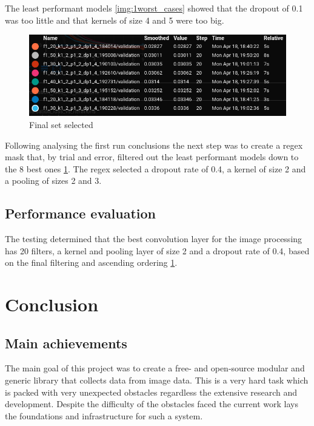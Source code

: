 \documentclass[
    11pt,
    oneside
]{report}
\begin{document}
The least performant models \ref{img:1worst_cases} showed that the dropout of 0.1 was too little and that kernels of size 4 and 5 were too big.


\begin{figure}[H]
    \includegraphics[keepaspectratio, width=\columnwidth]{Screenshot_2022-04-20_23-36-21.png}
    \caption{Final set selected}
    \label{img:final_set}
\end{figure}

Following analysing the first run conclusions the next step was to create a regex mask that, by trial and error, filtered out the least performant models down to the 8 best ones \ref{img:final_set}. The regex selected a dropout rate of 0.4, a kernel of size 2 and a pooling of sizes 2 and 3.




\section{Performance evaluation}

The testing determined that the best convolution layer for the image processing has 20 filters, a kernel and pooling layer of size 2 and a dropout rate of 0.4, based on the final filtering and ascending ordering \ref{img:final_set}.




\chapter{Conclusion}



\section{Main achievements}

The main goal of this project was to create a free- and open-source modular and generic library that collects data from image data. This is a very hard task which is packed with very unexpected obstacles regardless the extensive research and development. Despite the difficulty of the obstacles faced the current work lays the foundations and infrastructure for such a system.
\end{document}
